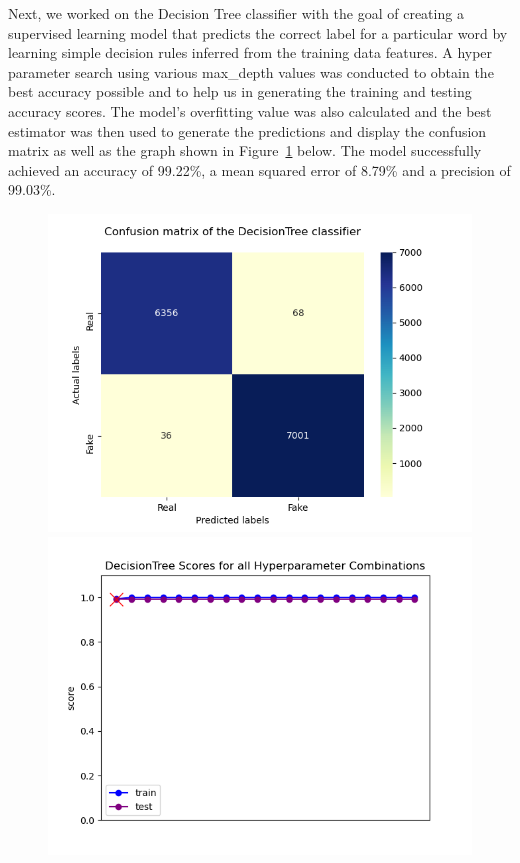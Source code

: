 \documentclass[10pt,twocolumn,letterpaper]{article}
\begin{document}
Next, we worked on the Decision Tree classifier with the goal of creating a supervised learning model that predicts the correct label for a particular word by learning simple decision rules inferred from the training data features. A hyper parameter search using various max\_depth values was conducted to obtain the best accuracy possible and to help us in generating the training and testing accuracy scores. The model's overfitting value was also calculated and the best estimator was then used to generate the predictions and display the confusion matrix as well as the graph shown in Figure~\ref{second_figure} below. The model successfully achieved an accuracy of 99.22\%, a mean squared error of 8.79\% and a precision of 99.03\%.
 
\begin{figure}[h]
   \begin{center}
        \includegraphics[width=\linewidth]{Latex_Report/report/Graphs/DT/confusion_matrix.png}
        \includegraphics[width=\linewidth]{Latex_Report/report/Graphs/DT/scores_plot.png}
   \end{center}
        \vspace*{-8mm}
        \caption{\label{second_figure}}
\end{figure}
\end{document}
